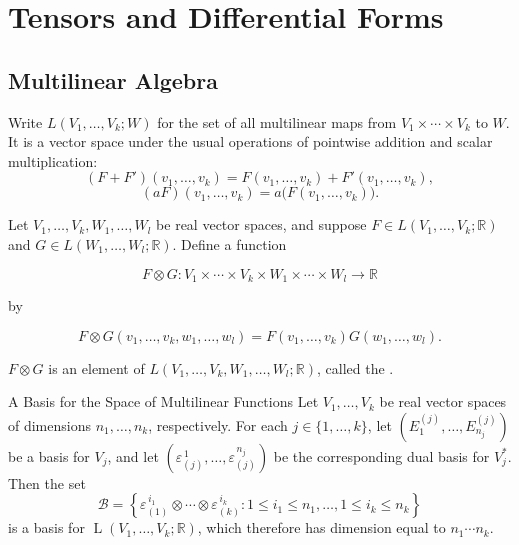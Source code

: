 \documentclass[../main.tex]{subfiles}
\begin{document}
\ifSubfilesClassLoaded{

    \tableofcontents
    
}{}

\chapter{ Tensors and Differential Forms}

\section{Multilinear Algebra}

\begin{definition}{}{}
    Write \(L(V_{1},\ldots,V_{k};W)\) for the set of all multilinear maps from \(V_{1}\times\cdots\times V_{k}\) to \(W\). It is a vector space under the usual operations of pointwise addition and scalar multiplication:
\[
(F+F')(v_{1},\ldots,v_{k})=F(v_{1},\ldots,v_{k})+F'(v_{1},\ldots,v_{k}),
\]
\[
(aF)(v_{1},\ldots,v_{k})=a\bigl(F(v_{1},\ldots,v_{k})\bigr).
\]
\end{definition}

\begin{definition}{}{}
   Let \(V_{1},\ldots,V_{k},W_{1},\ldots,W_{l}\) be real vector spaces, and suppose
\(F\in L(V_{1},\ldots,V_{k};\mathbb{R})\) and \(G\in L(W_{1},\ldots,W_{l};\mathbb{R})\). Define a function

\[
F\otimes G:V_{1}\times\cdots\times V_{k}\times W_{1}\times\cdots\times W_{l}\to\mathbb{R}
\]

by

\begin{equation}
F\otimes G(v_{1},\ldots,v_{k},w_{1},\ldots,w_{l})
=F(v_{1},\ldots,v_{k})G(w_{1},\ldots,w_{l}).
\end{equation}

\(F\otimes G\) is an element of
\(L(V_{1},\ldots,V_{k},W_{1},\ldots,W_{l};\mathbb{R})\), called the .
\end{definition}

\begin{proposition}{A Basis for the Space of Multilinear Functions}{}
Let $V_1,\dots,V_k$ be real vector spaces of dimensions $n_1,\dots,n_k$, respectively. For each $j\in\{1,\dots,k\}$, let $\left(E^{(j)}_1,\dots,E^{(j)}_{n_j}\right)$ be a basis for $V_j$, and let $\left(\varepsilon^{\,1}_{(j)},\dots,\varepsilon^{\,n_j}_{(j)}\right)$ be the corresponding dual basis for $V_j^*$. Then the set
\[
\mathcal{B}
=\left\{
\varepsilon^{\,i_1}_{(1)}\otimes\cdots\otimes\varepsilon^{\,i_k}_{(k)}
: 1\le i_1\le n_1,\dots,1\le i_k\le n_k
\right\}
\]
is a basis for $\operatorname{L}(V_1,\dots,V_k;\mathbb{R})$, which therefore has dimension equal to $n_1\cdots n_k$.
\end{proposition}
\end{document}
